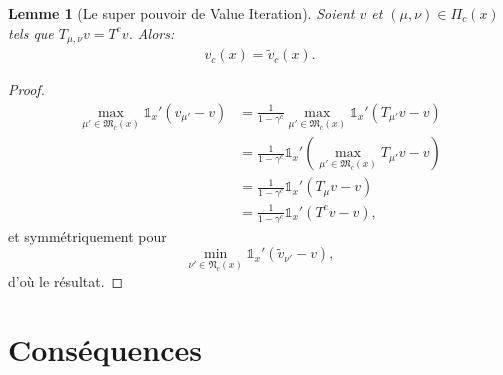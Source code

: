 \documentclass{article}
\newtheorem{lemma}{Lemme}
\def\1{{\mathds 1}}
\def\N{\mathfrak N}
\def\M{\mathfrak M}
\begin{document}
\begin{lemma}[Le super pouvoir de Value Iteration]
  Soient $v$ et $(\mu,\nu) \in \Pi_c(x)$ tels que $T_{\mu,\nu} v=T^c v$. Alors:
  \begin{align}
    v_c(x) = \tilde v_c(x).
  \end{align}
\end{lemma}

\begin{proof}
  \begin{align}
    \max_{\mu' \in \M_c(x)} \1_x' (v_{\mu'} - v) & =
    \frac{1}{1-\gamma^c} \max_{\mu' \in \M_c(x)} \1_x'(T_{\mu'}v - v) \\
    & = \frac{1}{1-\gamma^c} \1_x'(\max_{\mu' \in \M_c(x)}  T_{\mu'}v - v) \\
    & = \frac{1}{1-\gamma^c} \1_x'(T_{\mu}v - v) \\
    & = \frac{1}{1-\gamma^c} \1_x'(T^c v - v),
  \end{align}
  et symmétriquement pour $$\min_{\nu' \in \N_c(x)}\1_x' (\tilde v_{\nu'} - v),$$ d'où le résultat.
\end{proof}


\section{Conséquences}




 
\end{document}
